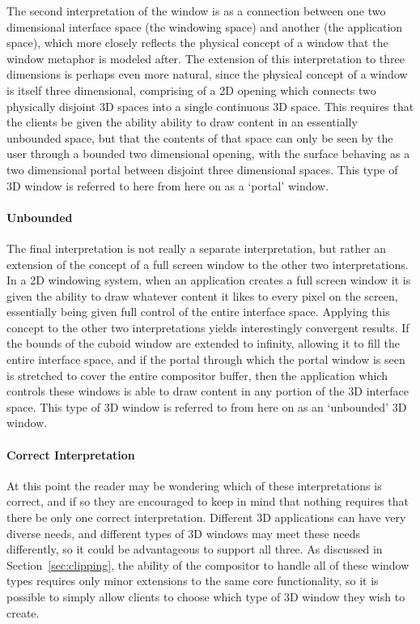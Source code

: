 The second interpretation of the window is as a connection between one two dimensional interface space (the windowing space) and another (the application space), which more closely reflects the physical concept of a window that the window metaphor is modeled after. The extension of this interpretation to three dimensions is perhaps even more natural, since the physical concept of a window is itself three dimensional, comprising of a 2D opening which connects two physically disjoint 3D spaces into a single continuous 3D space. This requires that the clients be given the ability ability to draw content in an essentially unbounded space, but that the contents of that space can only be seen by the user through a bounded two dimensional opening, with the surface behaving as a two dimensional portal between disjoint three dimensional spaces. This type of 3D window is referred to here from here on as a `portal' window.

\paragraph{Unbounded}

The final interpretation is not really a separate interpretation, but rather an extension of the concept of a full screen window to the other two interpretations. In a 2D windowing system, when an application creates a full screen window it is given the ability to draw whatever content it likes to every pixel on the screen, essentially being given full control of the entire interface space. Applying this concept to the other two interpretations yields interestingly convergent results. If the bounds of the cuboid window are extended to infinity, allowing it to fill the entire interface space, and if the portal through which the portal window is seen is stretched to cover the entire compositor buffer, then the application which controls these windows is able to draw content in any portion of the 3D interface space. This type of 3D window is referred to from here on as an `unbounded' 3D window.

\paragraph{Correct Interpretation}

At this point the reader may be wondering which of these interpretations is correct, and if so they are encouraged to keep in mind that nothing requires that there be only one correct interpretation. Different 3D applications can have very diverse needs, and different types of 3D windows may meet these needs differently, so it could be advantageous to support all three. As discussed in Section~\ref{sec:clipping}, the ability of the compositor to handle all of these window types requires only minor extensions to the same core functionality, so it is possible to simply allow clients to choose which type of 3D window they wish to create.
 
